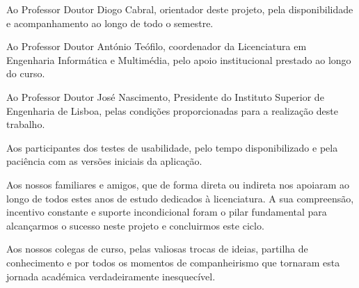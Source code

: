 




\hspace*{\parindent}Ao Professor Doutor Diogo Cabral, orientador deste projeto, pela disponibilidade e acompanhamento ao longo de todo o semestre.
\vspace{0.3cm}

\indent Ao Professor Doutor António Teófilo, coordenador da Licenciatura em Engenharia Informática e Multimédia, pelo apoio institucional prestado ao longo do curso.
\vspace{0.3cm}

\indent Ao Professor Doutor José Nascimento, Presidente do Instituto Superior de Engenharia de Lisboa, pelas condições proporcionadas para a realização deste trabalho.
\vspace{0.3cm}

\indent Aos participantes dos testes de usabilidade, pelo tempo disponibilizado e pela paciência com as versões iniciais da aplicação.
\vspace{0.3cm}

\indent Aos nossos familiares e amigos, que de forma direta ou indireta nos apoiaram ao longo de todos estes anos de estudo dedicados à licenciatura. A sua compreensão, incentivo constante e suporte incondicional foram o pilar fundamental para alcançarmos o sucesso neste projeto e concluirmos este ciclo.
\vspace{0.3cm}

\indent Aos nossos colegas de curso, pelas valiosas trocas de ideias, partilha de conhecimento e por todos os momentos de companheirismo que tornaram esta jornada académica verdadeiramente inesquecível.